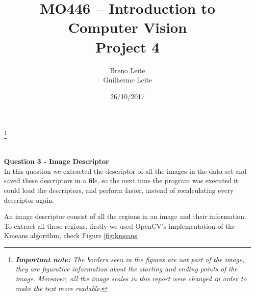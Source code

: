 \documentclass[12pt,a4paper]{article}
\title{MO446 -- Introduction to Computer Vision  \\ Project 4}
\author{Breno Leite  \\ Guilherme Leite}
\date{26/10/2017}
\newcommand\blfootnote[1]{%
	\begingroup
	\renewcommand\thefootnote{}\footnote{#1}%
	\addtocounter{footnote}{-1}%
	\endgroup
}
\begin{document}
\maketitle
\blfootnote{\textit{\textbf{Important note:} The borders seen in the figures are not part of the image, they are figurative information about the starting and ending points of the image. Moreover, all the image scales in this report were changed in order to make the text more readable.}} \\


\textbf{\LARGE Question 3 - Image Descriptor}\\

	In this question we extracted the descriptor of all the images in the data set and saved these descriptors in a file, so the next time the program was executed it could load the descriptors, and perform faster, instead of recalculating every descriptor again.

	An image descriptor consist of all the regions in an image and their information. To extract all these regions, firstly we used OpenCV's implementation of the Kmeans algorithm, check Figure \ref{fig:kmeans}.

\newpage
\end{document}
